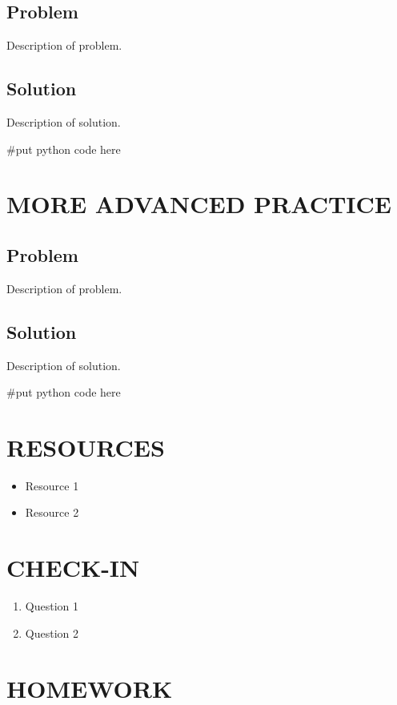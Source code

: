 \documentclass[14pt]{extreport}%
\begin{document}
\subsection*{Problem}
Description of problem.
\subsection*{Solution}
Description of solution. \\
\begin{python}
#put python code here
\end{python}

\section*{MORE ADVANCED PRACTICE} 
\subsection*{Problem}
Description of problem.
\subsection*{Solution}
Description of solution. \\
\begin{python}
#put python code here
\end{python}

\section*{RESOURCES}
\begin{itemize}
    \item Resource 1
    \item Resource 2
\end{itemize}

\section*{CHECK-IN}
\begin{enumerate}
    \item Question 1
    \item Question 2
\end{enumerate}

\section*{HOMEWORK}
\end{document}
